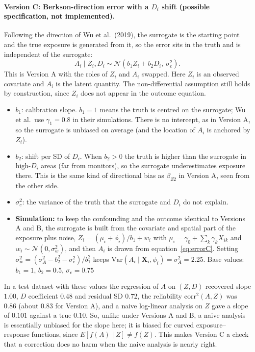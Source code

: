 \documentclass[11pt]{article}
\begin{document}
\paragraph{Version C: Berkson-direction error with a $D_i$ shift (possible specification, not implemented).}

Following the direction of Wu et al.\ (2019), the surrogate is the starting point and the true exposure is
generated from it, so the error sits in the truth and is independent of the surrogate:
\begin{equation}
A_i \mid Z_i, D_i \sim \mathcal{N}(b_1 Z_i + b_2 D_i,\ \sigma_e^2).
\label{eq:errorC}
\end{equation}
This is Version A with the roles of $Z_i$ and $A_i$ swapped. Here $Z_i$ is an observed covariate and
$A_i$ is the latent quantity. The non-differential assumption still holds by construction, since $Z_i$ does not
appear in the outcome equation.

\begin{itemize}
\item \textbf{$b_1$}: calibration slope. $b_1 = 1$ means the truth is centred on the surrogate; Wu et al.\ use
$\gamma_1 = 0.8$ in their simulations. There is no intercept, as in Version A, so the surrogate is unbiased on average
(and the location of $A_i$ is anchored by $Z_i$).
\item \textbf{$b_2$}: shift per SD of $D_i$. When $b_2 > 0$ the truth is higher than the surrogate in
high-$D_i$ areas (far from monitors), so the surrogate underestimates exposure there. This is the same kind of
directional bias as $\beta_{Z2}$ in Version A, seen from the other side.
\item \textbf{$\sigma_e^2$}: the variance of the truth that the surrogate and $D_i$ do not explain.
\item \textbf{Simulation:} to keep the confounding and the outcome identical to Versions A and B, the
surrogate is built from the covariate and spatial part of the exposure plus noise,
$Z_i = (\mu_i + \phi_i)/b_1 + w_i$ with $\mu_i = \gamma_0 + \sum_k \gamma_k X_{ik}$ and
$w_i \sim \mathcal{N}(0, \sigma_w^2)$, and then $A_i$ is drawn from equation~\eqref{eq:errorC}. Setting
$\sigma_w^2 = (\sigma_A^2 - b_2^2 - \sigma_e^2)/b_1^2$ keeps
$\text{Var}(A_i \mid \mathbf{X}_i, \phi_i) = \sigma_A^2 = 2.25$. Base values: $b_1 = 1$, $b_2 = 0.5$,
$\sigma_e = 0.75$
\end{itemize}

In a test dataset with these values the regression of $A$ on $(Z, D)$ recovered slope $1.00$, $D$ coefficient
$0.48$ and residual SD $0.72$, the reliability $\text{corr}^2(A, Z)$ was $0.86$ (about $0.83$ for Version A), and a naive
log-linear analysis on $Z$ gave a slope of $0.101$ against a true $0.10$. So, unlike under Versions A and B, a naive analysis is
essentially unbiased for the slope here; it is biased for curved exposure--response functions, since
$E[f(A) \mid Z] \neq f(Z)$. This makes Version C a check that a correction does no harm when the naive analysis is nearly right.
\end{document}
